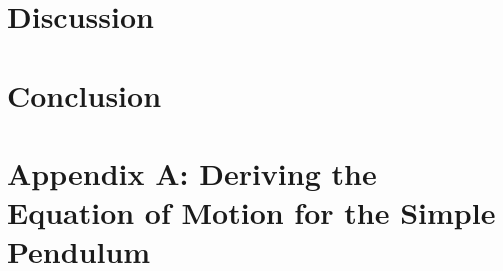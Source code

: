 \documentclass[iop]{emulateapj}
\begin{document}


















\section{Discussion}
\label{sec:discuss}
































\section{Conclusion}








\appendix
{}
\section{Appendix A: Deriving the Equation of Motion for the Simple Pendulum}
\end{document}
